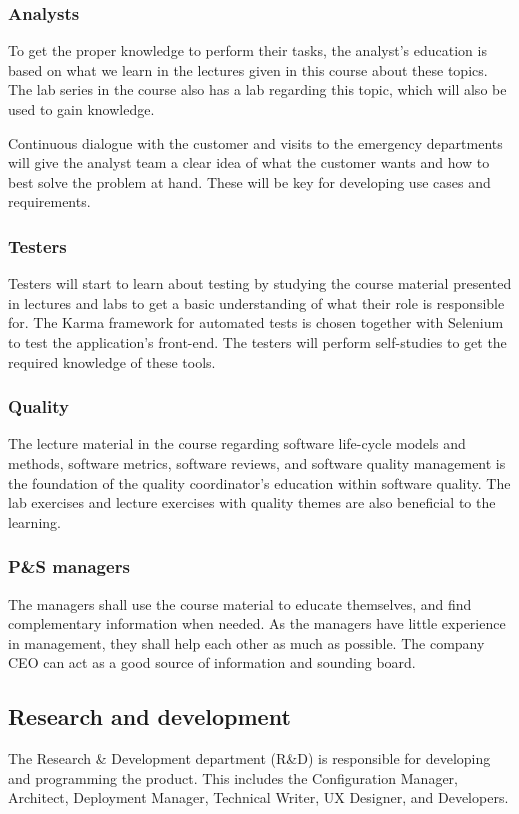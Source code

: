 \subsubsection{Analysts}
To get the proper knowledge to perform their tasks, the analyst's education is based on what we learn in the lectures given in this course about these topics. The lab series in the course also has a lab regarding this topic, which will also be used to gain knowledge.

Continuous dialogue with the customer and visits to the emergency departments will give the analyst team a clear idea of what the customer wants and how to best solve the problem at hand. These will be key for developing use cases and requirements. 

\subsubsection{Testers}
Testers will start to learn about testing by studying the course material presented in lectures and labs to get a basic understanding of what their role is responsible for. The Karma framework for automated tests is chosen together with Selenium to test the application's front-end. The testers will perform self-studies to get the required knowledge of these tools. 

\subsubsection{Quality}
The lecture material in the course regarding software life-cycle models and methods, software metrics, software reviews, and software quality management is the foundation of the quality coordinator's education within software quality. The lab exercises and lecture exercises with quality themes are also beneficial to the learning. 

\subsubsection{P\&S managers}
The managers shall use the course material to educate themselves, and find complementary information when needed. As the managers have little experience in management, they shall help each other as much as possible. The company CEO can act as a good source of information and sounding board. 

\subsection{Research and development}
The Research \& Development department (R\&D) is responsible for developing and programming the product. This includes the Configuration Manager, Architect, Deployment Manager, Technical Writer, UX Designer, and Developers. 

